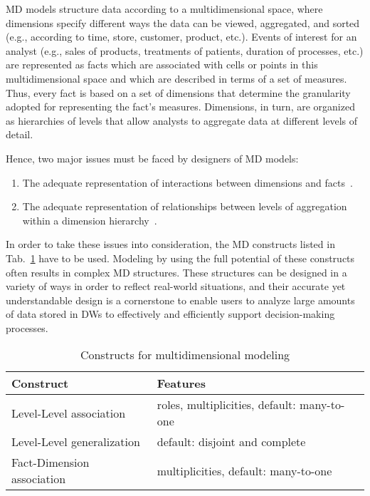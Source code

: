 MD models structure data according to a multidimensional space,
where dimensions specify different ways the data can be viewed,
aggregated, and sorted (e.g., according to time, store, customer,
product, etc.).  Events of interest for an analyst (e.g., sales of
products, treatments of patients, duration of processes, etc.)  are
represented as facts which are associated with cells or points in
this multidimensional space and which are described in terms of a
set of measures.  Thus, every fact is based on a set of dimensions
that determine the granularity adopted for representing the fact's
measures. Dimensions, in turn, are organized as hierarchies of
levels that allow analysts to aggregate data at different levels of
detail.

Hence, two major issues must be faced by designers of MD models:
\begin{enumerate}
\item The adequate representation of interactions between dimensions and
  facts~\cite{DBLP:conf/dmdw/SongRME01}.
\item The adequate representation of relationships between levels of
  aggregation within a dimension
  hierarchy~\cite{DBLP:conf/vldb/JagadishLS99}.
\end{enumerate}

In order to take these issues into consideration, the MD constructs
listed in Tab.~\ref{a1:tab:md-constructs} have to be used. Modeling
by using the full potential of these constructs often results in
complex MD structures. These structures can be designed in a variety
of ways in order to reflect real-world situations, and their
accurate yet understandable design is a cornerstone to enable users
to analyze large amounts of data stored in DWs to effectively and
efficiently support decision-making processes.

\begin{table}
  \centering
  \caption{Constructs for multidimensional modeling}
  \label{a1:tab:md-constructs}
  \begin{tabular}{|l|l|}
    \hline
    Construct & Features\\
    \hline\hline
    Level-Level association & roles, multiplicities, default: many-to-one\\
    Level-Level generalization & default: disjoint and complete\\
    Fact-Dimension association & multiplicities, default: many-to-one\\
    \hline
  \end{tabular}
\end{table}

